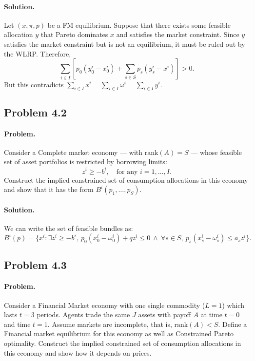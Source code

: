 \paragraph{Solution.}
Let $(x, \pi, p)$ be a FM equilibrium. Suppose that there exists some feasible allocation $y$ that Pareto dominates $x$ and satisfies the market constraint. Since $y$ satisfies the market constraint but is not an equilibrium, it must be ruled out by the WLRP. Therefore,
\[
\sum_{i \in I} \left[ p_0 (y_0^i - x_0^i) + \sum_{s \in S} p_s (y_s^i - x^i) \right] > 0.
\]
But this contradicts $\sum_{i \in I} x^i = \sum_{i \in I} \omega^i = \sum_{i \in I} y^i$.

\subsection{Problem 4.2}
\paragraph{Problem.} Consider a Complete market economy --- with $\text{rank}(A) = S$ --- whose feasible set of asset portfolios is restricted by borrowing limits:
\[
z^i \geq -b^i, \quad \text{for any } i = 1, \ldots, I.
\]
Construct the implied constrained set of consumption allocations in this economy and show that it has the form $B^i(p_1, \ldots, p_S)$.

\paragraph{Solution.}
We can write the set of feasible bundles as:
\[
B^i(p) = \{ x^i : \exists z^i \geq -b^i, \ p_0 (x_0^i - \omega_0^i) + q z^i \leq 0 \ \wedge \ \forall s \in S, \ p_s (x_s^i - \omega_s^i) \leq a_s z^i \}.
\]

\subsection{Problem 4.3}
\paragraph{Problem.} Consider a Financial Market economy with one single commodity ($L = 1$) which lasts $t = 3$ periods. Agents trade the same $J$ assets with payoff $A$ at time $t = 0$ and time $t = 1$. Assume markets are incomplete, that is, $\text{rank}(A) < S$. Define a Financial market equilibrium for this economy as well as Constrained Pareto optimality. Construct the implied constrained set of consumption allocations in this economy and show how it depends on prices.

